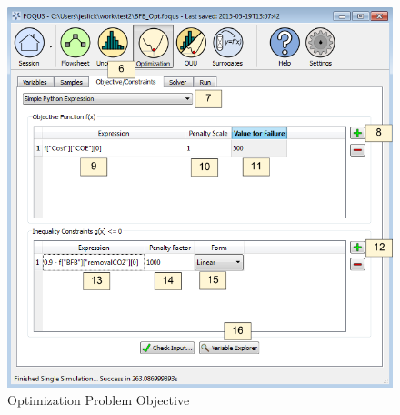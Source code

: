 \begin{figure}[H] 
	\begin{center}
		\includegraphics[scale=0.55]{Chapt_optimization/figs/optProblemObj}
		\caption{Optimization Problem Objective}
		\label{tut.opt.problem.obj}
	\end{center}
\end{figure}


